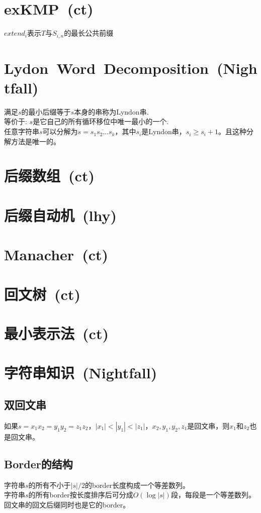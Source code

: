 \section{exKMP\ \small(ct)}
    $ extend_i $表示$ T $与$ S_{i,n} $的最长公共前缀
\section{Lydon\ Word\ Decomposition\ \small(Nightfall)}
	满足$ s $的最小后缀等于$ s $本身的串称为Lyndon串.
	\\等价于: $ s $是它自己的所有循环移位中唯一最小的一个.
	\\任意字符串$ s $可以分解为$ s = \overline{s_1 s_2 \dots s_k} $，其中$ s_i $是Lyndon串，$ s_i \geq s_i + 1 $。且这种分解方法是唯一的。
\section{后缀数组\ \small(ct)}
\section{后缀自动机\ \small(lhy)}
\section{Manacher\ \small(ct)}
\section{回文树\ \small(ct)}
\section{最小表示法\ \small(ct)}
\section{字符串知识\ \small(Nightfall)}
	\subsection*{双回文串}
		如果$ s = x_1 x_2 = y_1 y_2 = z_1 z_2 $，$ \left|x_1\right| < \left|y_1\right| < \left|z_1\right| $，$ x_2, y_1, y_2, z_1 $是回文串，则$ x_1 $和$ z_2 $也是回文串。
	\subsection*{Border的结构}
		字符串$ s $的所有不小于$ \left|s\right| / 2 $的border长度构成一个等差数列。
		\\字符串$ s $的所有border按长度排序后可分成$ O(\log \left| s \right|) $段，每段是一个等差数列。
		\\回文串的回文后缀同时也是它的border。
